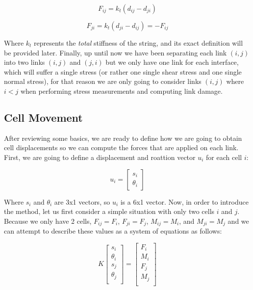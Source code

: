 \begin{equation} \label{eq:fij}
    F_{ij} = k_t(d_{ij} - d_{ji})
\end{equation}

\begin{equation}\label{eq:fji}
    F_{ji} = k_t(d_{ji} - d_{ij}) = -F_{ij}
\end{equation}

Where $k_t$ represents the \textit{total} stiffness of the string, and its exact definition
will be provided later. Finally, up until now we have been separating 
each link $(i,j)$ into two links $(i,j)$ and $(j,i)$ but we only have 
one link for each interface, which will suffer a single stress (or rather 
one single shear stress and one single normal stress), for that reason 
we are only going to consider links $(i,j)$ where $i < j$ when performing
stress measurements and computing link damage.
\subsection{Cell Movement}

After reviewing some basics, we are ready to define how we are going to 
obtain cell displacements so we can compute the forces that are applied 
on each link. First, we are going to define a displacement and roattion 
vector $u_i$ for each cell $i$:

\begin{equation}
    u_i =
    \begin{bmatrix}
        s_i \\
        \theta_i    
    \end{bmatrix}
\end{equation}

Where $s_i$ and $\theta_i$ are 3x1 vectors, so $u_i$ is a 6x1 vector. Now, 
in order to introduce the method, let us first consider a simple situation 
with only two cells $i$ and $j$. Because we only have 2 cells,  
$F_{ij} = F_i$, $F_{ji} = F_j$, $M_{ij} = M_i$, and $M_{ji} = M_j$ and we 
can attempt to describe these values as a system of equations as follows:

\begin{equation}
    K \begin{bmatrix}
        s_i \\
        \theta_i \\
        s_j \\
        \theta_j\\
    \end{bmatrix}
    =
    \begin{bmatrix}
        F_i \\
        M_i \\
        F_j \\
        M_j\\
    \end{bmatrix}
\end{equation}

